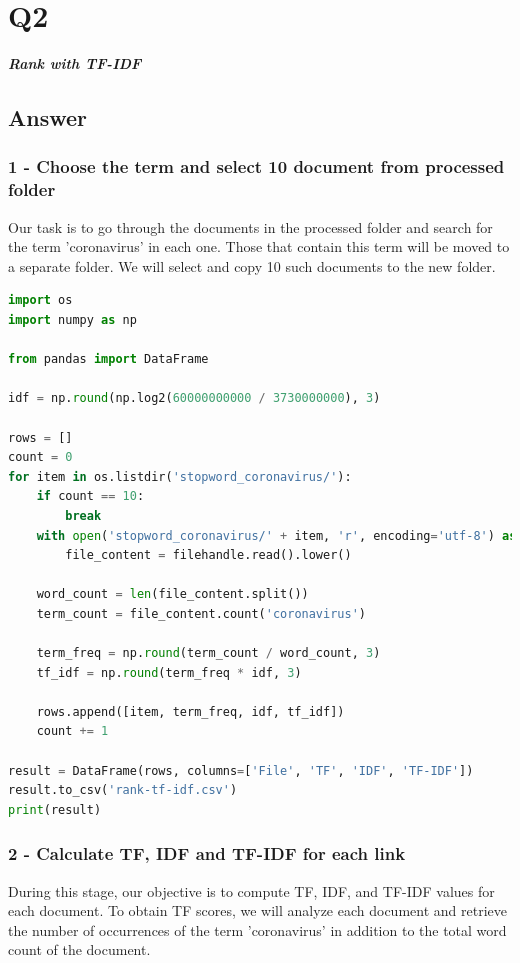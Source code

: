\documentclass[12pt]{article}
\begin{document}
\section*{Q2}

\emph{ \textbf{Rank with TF-IDF}}

\subsection*{Answer}
\subsubsection*{1 - Choose the term and select 10 document from processed folder}

Our task is to go through the documents in the processed folder and search for the term 'coronavirus' in each one. Those that contain this term will be moved to a separate folder. We will select and copy 10 such documents to the new folder.

\begin{lstlisting}[language=Python, caption=Copy files that contain the term to separate folder]
import os
import numpy as np

from pandas import DataFrame

idf = np.round(np.log2(60000000000 / 3730000000), 3)

rows = []
count = 0
for item in os.listdir('stopword_coronavirus/'):
    if count == 10:
        break
    with open('stopword_coronavirus/' + item, 'r', encoding='utf-8') as filehandle:
        file_content = filehandle.read().lower()

    word_count = len(file_content.split())
    term_count = file_content.count('coronavirus')

    term_freq = np.round(term_count / word_count, 3)
    tf_idf = np.round(term_freq * idf, 3)

    rows.append([item, term_freq, idf, tf_idf])
    count += 1

result = DataFrame(rows, columns=['File', 'TF', 'IDF', 'TF-IDF'])
result.to_csv('rank-tf-idf.csv')
print(result)

\end{lstlisting}

\subsubsection*{2 - Calculate TF, IDF and TF-IDF for each link }

During this stage, our objective is to compute TF, IDF, and TF-IDF values for each document. To obtain TF scores, we will analyze each document and retrieve the number of occurrences of the term 'coronavirus' in addition to the total word count of the document.
\end{document}
